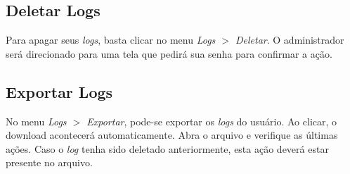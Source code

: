 \subsection{Deletar Logs}

Para apagar seus \textit{logs}, basta clicar no menu \textit{Logs $>$ Deletar}. O administrador será direcionado para uma tela que pedirá sua senha para confirmar a ação. 

\subsection{Exportar Logs}

No menu \textit{Logs $>$ Exportar}, pode-se exportar os \textit{logs} do usuário. Ao clicar, o download acontecerá automaticamente. Abra o arquivo e verifique as últimas ações. Caso o \textit{log} tenha sido deletado anteriormente, esta ação deverá estar presente no arquivo.

